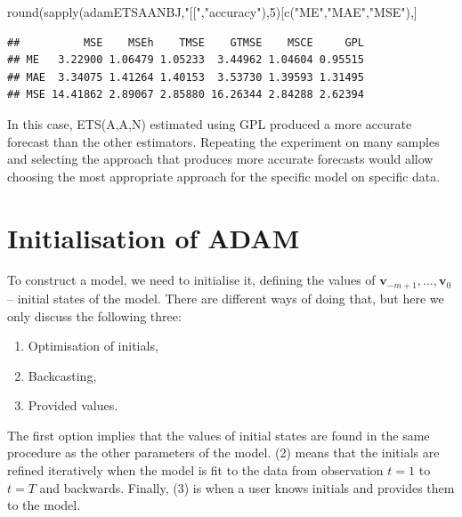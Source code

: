 \documentclass[
]{book}
\newenvironment{Shaded}{\begin{snugshade}}{\end{snugshade}}
\newcommand{\DecValTok}[1]{\textcolor[rgb]{0.00,0.00,0.81}{#1}}
\newcommand{\FunctionTok}[1]{\textcolor[rgb]{0.00,0.00,0.00}{#1}}
\newcommand{\NormalTok}[1]{#1}
\newcommand{\StringTok}[1]{\textcolor[rgb]{0.31,0.60,0.02}{#1}}
\providecommand{\tightlist}{%
  \setlength{\itemsep}{0pt}\setlength{\parskip}{0pt}}
\theoremstyle{definition}
\theoremstyle{definition}
\theoremstyle{definition}
\theoremstyle{definition}
\theoremstyle{remark}
\begin{document}
\begin{Shaded}
\begin{Highlighting}[]
\FunctionTok{round}\NormalTok{(}\FunctionTok{sapply}\NormalTok{(adamETSAANBJ,}\StringTok{"[["}\NormalTok{,}\StringTok{"accuracy"}\NormalTok{),}\DecValTok{5}\NormalTok{)[}\FunctionTok{c}\NormalTok{(}\StringTok{"ME"}\NormalTok{,}\StringTok{"MAE"}\NormalTok{,}\StringTok{"MSE"}\NormalTok{),]}
\end{Highlighting}
\end{Shaded}

\begin{verbatim}
##          MSE    MSEh    TMSE    GTMSE    MSCE     GPL
## ME   3.22900 1.06479 1.05233  3.44962 1.04604 0.95515
## MAE  3.34075 1.41264 1.40153  3.53730 1.39593 1.31495
## MSE 14.41862 2.89067 2.85880 16.26344 2.84288 2.62394
\end{verbatim}

In this case, ETS(A,A,N) estimated using GPL produced a more accurate forecast than the other estimators. Repeating the experiment on many samples and selecting the approach that produces more accurate forecasts would allow choosing the most appropriate approach for the specific model on specific data.

\hypertarget{ADAMInitialisation}{%
\section{Initialisation of ADAM}\label{ADAMInitialisation}}

To construct a model, we need to initialise it, defining the values of \(\mathbf{v}_{-m+1}, \dots, \mathbf{v}_0\) -- initial states of the model. There are different ways of doing that, but here we only discuss the following three:

\begin{enumerate}
\def\labelenumi{\arabic{enumi}.}
\tightlist
\item
  Optimisation of initials,
\item
  Backcasting,
\item
  Provided values.
\end{enumerate}

The first option implies that the values of initial states are found in the same procedure as the other parameters of the model. (2) means that the initials are refined iteratively when the model is fit to the data from observation \(t=1\) to \(t=T\) and backwards. Finally, (3) is when a user knows initials and provides them to the model.
\end{document}

